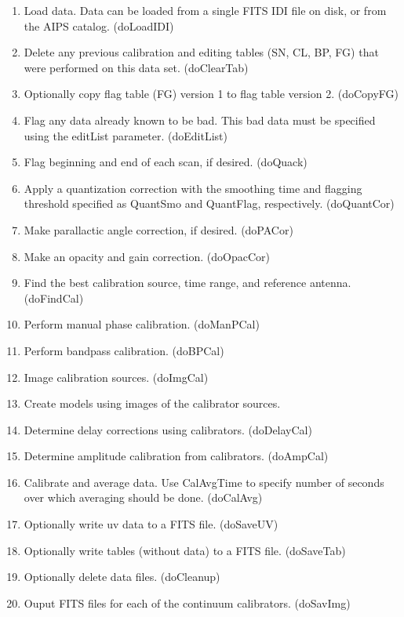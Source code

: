 \documentclass[10pt,onecolumn,final]{IEEEtran}
\begin{document}
\begin{enumerate}
\item Load data.  Data can be loaded from a single FITS IDI file on disk, or from the AIPS catalog.  (doLoadIDI)
\item Delete any previous calibration and editing tables (SN, CL, BP, FG) that were performed on this data set. (doClearTab)
\item Optionally copy flag table (FG) version 1 to flag table version 2.  (doCopyFG)
\item Flag any data already known to be bad.  This bad data must be specified using the editList parameter. (doEditList)
\item Flag beginning and end of each scan, if desired.  (doQuack)
\item Apply a quantization correction with the smoothing time and flagging threshold specified as QuantSmo and QuantFlag, respectively.  (doQuantCor)
\item Make parallactic angle correction, if desired.  (doPACor)
\item Make an opacity and gain correction.  (doOpacCor)
\item Find the best calibration source, time range, and reference antenna. (doFindCal)
\item Perform manual phase calibration.  (doManPCal)
\item Perform bandpass calibration.  (doBPCal)
\item Image calibration sources.  (doImgCal)
\item Create models using images of the calibrator sources.
\item Determine delay corrections using calibrators.  (doDelayCal)
\item Determine amplitude calibration from calibrators.  (doAmpCal)
\item Calibrate and average data.  Use CalAvgTime to specify number of seconds over which averaging should be done.  (doCalAvg)
\item Optionally write uv data to a FITS file.  (doSaveUV)
\item Optionally write tables (without data) to a FITS file.  (doSaveTab)
\item Optionally delete data files.  (doCleanup)
\item Ouput FITS files for each of the continuum calibrators.  (doSavImg)
\end{enumerate}
\end{document}
